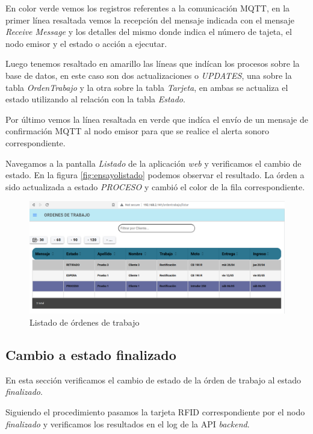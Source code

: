 En color verde vemos los registros referentes a la comunicación MQTT, en la primer línea resaltada vemos la recepción del mensaje indicada con el mensaje \textit{Receive Message} y los detalles del mismo donde indica el número de tajeta, el nodo emisor y el estado o acción a ejecutar.

Luego tenemos resaltado en amarillo las líneas que indícan los procesos sobre la base de datos, en este caso son dos actualizaciones o \textit{UPDATES}, una sobre la tabla \textit{OrdenTrabajo} y la otra sobre la tabla \textit{Tarjeta}, en ambas se actualiza el estado utilizando al relación con la tabla \textit{Estado}.

Por último vemos la línea resaltada en verde que indíca el envío de un mensaje de confirmación MQTT al nodo emisor para que se realice el alerta sonoro correspondiente.

Navegamos a la pantalla \textit{Listado} de la aplicación \textit{web} y verificamos el cambio de estado. En la figura \ref{fig:ensayolistado} podemos observar el resultado. La órden a sido actualizada a estado \textit{PROCESO} y cambió el color de la fila correspondiente.

\begin{figure}[H]
	\centering
	\includegraphics[width=\textwidth]{./Figures/ensayo-1/12.cambioestado-listado.png}
	\caption{Listado de órdenes de trabajo}
	\label{fig:ensayolistadoweb}
\end{figure}

\subsection{Cambio a estado finalizado}
\label{subsec:ensayoafinalizado}

En esta sección verificamos el cambio de estado de la órden de trabajo al estado \textit{finalizado}.

Siguiendo el procedimiento pasamos la tarjeta RFID correspondiente por el nodo \textit{finalizado} y verificamos los resultados en el log de la API \textit{backend}.

